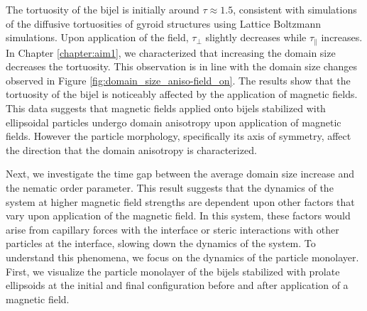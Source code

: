 The tortuosity of the bijel is initially around $\tau \approx 1.5$, consistent with simulations of the diffusive tortuosities of gyroid structures using 
Lattice Boltzmann simulations. \cite{luo_macroscopic_2020} Upon application of the field, $\tau_{\perp}$ slightly decreases while $\tau_{\parallel}$
increases. In Chapter \ref{chapter:aim1}, we characterized that increasing the domain size decreases the tortuosity. \cite{karthikeyan_formation_2024} This
observation is in line with the domain size changes observed in Figure \ref{fig:domain_size_aniso-field_on}. The results show that the
tortuosity of the bijel is noticeably affected by the application of magnetic fields. This data suggests that magnetic fields applied onto
bijels stabilized with ellipsoidal particles undergo domain anisotropy upon application of magnetic fields. However the particle morphology,
specifically its axis of symmetry, affect the direction that the domain anisotropy is characterized.

Next, we investigate the time gap between the average domain size increase and the nematic order parameter. This result suggests that the dynamics 
of the system at higher magnetic field strengths are dependent upon other factors that vary upon application of the magnetic field. In this system, these factors
would arise from capillary forces with the interface or steric interactions with other particles at the interface, slowing down the dynamics of the system.
To understand this phenomena, we focus on the dynamics of the particle monolayer. First, we visualize the particle monolayer of the bijels stabilized with prolate 
ellipsoids at the initial and final configuration before and after application of a magnetic field.

